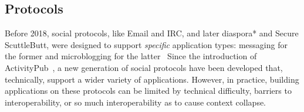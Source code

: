 





\subsection{Protocols}
\label{related-work:protocols}

Before 2018, social protocols, like Email and IRC,
and later diaspora* and Secure ScuttleButt,
were designed to support \emph{specific} application types:
messaging for the former and microblogging for the latter~\cite{diaspora,scuttlebutt}
Since the introduction of ActivityPub~\cite{activitypub},
a new generation of social protocols have
been developed that, technically, support a wider variety of applications.
However, in practice,
building applications on these protocols can be limited by technical
difficulty, barriers to interoperability, or so much interoperability
as to cause context collapse.

